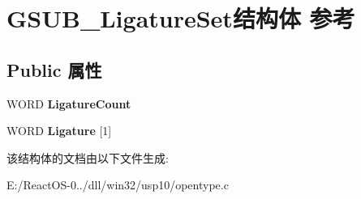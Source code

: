 \hypertarget{struct_g_s_u_b___ligature_set}{}\section{G\+S\+U\+B\+\_\+\+Ligature\+Set结构体 参考}
\label{struct_g_s_u_b___ligature_set}
\subsection*{Public 属性}
\begin{DoxyCompactItemize}
\item 
\mbox{\label{struct_g_s_u_b___ligature_set_ae90cb8f7b371d9179c49dba120d5ec9e}} 
W\+O\+RD {\bfseries Ligature\+Count}
\item 
\mbox{\label{struct_g_s_u_b___ligature_set_af0a888586c9b997ac0ebb074f0207fb9}} 
W\+O\+RD {\bfseries Ligature} \mbox{[}1\mbox{]}
\end{DoxyCompactItemize}


该结构体的文档由以下文件生成\+:\begin{DoxyCompactItemize}
\item 
E\+:/\+React\+O\+S-\/0../dll/win32/usp10/opentype.\+c\end{DoxyCompactItemize}

